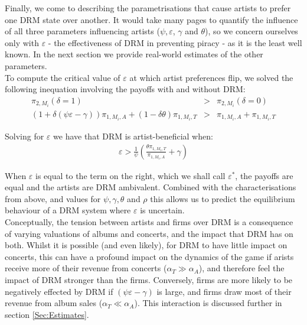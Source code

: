 \documentclass[letter,12pt]{article}
\numberwithin{equation}{section}
\newcommand{\artistpayoff}[2]{\pi_{#1, M_{#2}}}
\newcommand{\artistalbum}[2]{\pi_{#1, M_{#2}, A}}
\newcommand{\artistticket}[2]{\pi_{#1, M_{#2}, T}}
\newcommand{\drminf}{(\psi \varepsilon - \gamma)}
\begin{document}
Finally, we come to describing the parametrisations that cause artists to prefer one DRM state over another. It would take many pages to quantify the influence of all three parameters influencing artists ($\psi, \varepsilon$, $\gamma$ and $\theta$), so we concern ourselves only with $\varepsilon$ - the effectiveness of DRM in preventing piracy - as it is the least well known. In the next section we provide real-world estimates of the other parameters.\\

To compute the critical value of $\varepsilon$ at which artist preferences flip, we solved the following inequation involving the payoffs with and without DRM:
\begin{eqnarray*}
\artistpayoff{2}{i}(\delta = 1) & > & \artistpayoff{2}{i}(\delta = 0)\\
(1 + \delta \drminf) \artistalbum{1}{i} + (1 - \delta \theta) \artistticket{1}{i} & > & \artistalbum{1}{i} + \artistticket{1}{i}
\end{eqnarray*}

Solving for $\varepsilon$ we have that DRM is artist-beneficial when:
\begin{eqnarray}
\varepsilon > \frac{1}{\psi} \left( \frac{\theta \artistticket{1}{i}}{\artistalbum{1}{i}} + \gamma \right)
\label{Eq:EpsilonStar}
\end{eqnarray}

When $\varepsilon$ is equal to the term on the right, which we shall call $\varepsilon^*$, the payoffs are equal and the artists are DRM ambivalent. Combined with the characterisations from above, and values for $\psi, \gamma, \theta$ and $\rho$ this allows us to predict the equilibrium behaviour of a DRM system where $\varepsilon$ is uncertain.\\

Conceptually, the tension between artists and firms over DRM is a consequence of varying valuations of albums and concerts, and the impact that DRM has on both. Whilst it is possible (and even likely), for DRM to have little impact on concerts, this can have a profound impact on the dynamics of the game if arists receive more of their revenue from concerts ($\alpha_T \gg \alpha_A$), and therefore feel the impact of DRM stronger than the firms. Conversely, firms are more likely to be negatively effected by DRM if $\drminf$ is large, and firms draw most of their revenue from album sales ($\alpha_T \ll \alpha_A$). This interaction is discussed further in section \ref{Sec:Estimates}.
\end{document}
